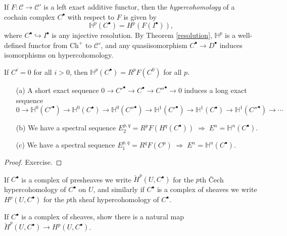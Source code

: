 \begin{defn} If $F : \mathcal{C} \rightarrow \mathcal{C}'$ is a left exact additive functor, then the \emph{hypercohomology} of a cochain complex $C^\bullet$ with respect to $F$ is given by
\[
\mathbb{H}^p(C^\bullet) = H^p(F(I^\bullet)),
\]
where $C^\bullet \hookrightarrow I^\bullet$ is any injective resolution. By Theorem \ref{resolution}, $\mathbb{H}^p$ is a well-defined functor from $\mbox{Ch}^+$ to $\mathcal{C}'$, and any quasiisomorphism $C^\bullet \rightarrow D^\bullet$ induces isomorphisms on hypercohomology.
\end{defn}

\begin{rem} If $C^i = 0$ for all $i > 0$, then $\mathbb{H}^p(C^\bullet) = R^pF(C^0)$ for all $p$.
\end{rem}

\begin{thm}
\begin{itemize}
\item[{\rm (a)}] A short exact sequence $0 \rightarrow C'^\bullet \rightarrow C^\bullet \rightarrow C''^\bullet \rightarrow 0$ induces a long exact sequence
\[
0 \rightarrow \mathbb{H}^0(C'^\bullet) \rightarrow \mathbb{H}^0(C^\bullet) \rightarrow \mathbb{H}^0(C''^\bullet) \rightarrow \mathbb{H}^1(C'^\bullet) \rightarrow \mathbb{H}^1(C^\bullet) \rightarrow \mathbb{H}^1(C''^\bullet) \rightarrow \cdots
\]

\item[{\rm (b)}] We have a spectral sequence $E^{p,q}_2 = R^pF(H^q(C^\bullet))\;\Rightarrow\;E^n = \mathbb{H}^n(C^\bullet)$.

\item[{\rm (c)}] We have a spectral sequence $E^{p,q}_1 = R^qF(C^p)\;\Rightarrow\;E^n = \mathbb{H}^n(C^\bullet)$.
\end{itemize}
\end{thm}
\begin{proof} Exercise.
\end{proof}

\begin{defn} If $C^\bullet$ is a complex of presheaves we write $\check{H}^p(U,C^\bullet)$ for the $p$th \v{C}ech hypercohomology of $C^\bullet$ on $U$, and similarly if $C^\bullet$ is a complex of sheaves we write $H^p(U,C^\bullet)$ for the $p$th sheaf hypercohomology of $C^\bullet$.
\end{defn}

\begin{exer} If $C^\bullet$ is a complex of sheaves, show there is a natural map $\check{H}^p(U,C^\bullet) \rightarrow H^p(U,C^\bullet)$.
\end{exer}

